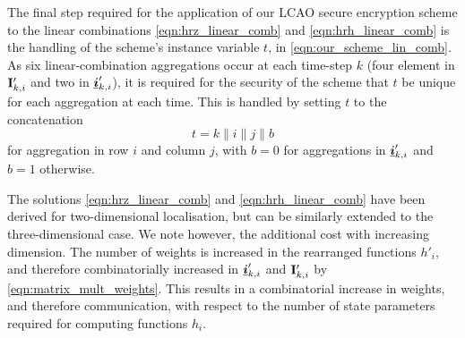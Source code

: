 \documentclass[twocolumn]{autart}
\begin{document}
The final step required for the application of our LCAO secure encryption scheme to the linear combinations \eqref{eqn:hrz_linear_comb} and \eqref{eqn:hrh_linear_comb} is the handling of the scheme's instance variable $t$, in \eqref{eqn:our_scheme_lin_comb}. As six linear-combination aggregations occur at each time-step $k$ (four element in ${{\mathbf{I}}}'_{k,i}$ and two in ${\boldsymbol{\underline{i}}}'_{k,i}$), it is required for the security of the scheme that $t$ be unique for each aggregation at each time. This is handled by setting $t$ to the concatenation 
\begin{equation}
    t=k\mathbin\|i\mathbin\|j\mathbin\|b
\end{equation}
for aggregation in row $i$ and column $j$, with $b=0$ for aggregations in ${\boldsymbol{\underline{i}}}'_{k,i}$ and $b=1$ otherwise.
\begin{rem}
    The solutions \eqref{eqn:hrz_linear_comb} and \eqref{eqn:hrh_linear_comb} have been derived for two-dimensional localisation, but can be similarly extended to the three-dimensional case. We note however, the additional cost with increasing dimension. The number of weights is increased in the rearranged functions $h'_i$, and therefore combinatorially increased in ${\boldsymbol{\underline{i}}}'_{k,i}$ and ${{\mathbf{I}}}'_{k,i}$ by \eqref{eqn:matrix_mult_weights}. This results in a combinatorial increase in weights, and therefore communication, with respect to the number of state parameters required for computing functions $h_i$.
\end{rem}

% 
% 
\end{document}
